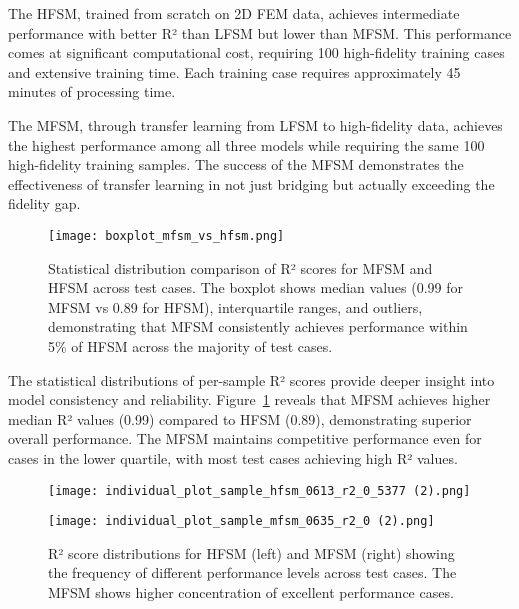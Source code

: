 \documentclass[12pt,a4paper]{report}
\begin{document}
The HFSM, trained from scratch on 2D FEM data, achieves intermediate performance with better R² than LFSM but lower than MFSM. This performance comes at significant computational cost, requiring 100 high-fidelity training cases and extensive training time. Each training case requires approximately 45 minutes of processing time.

The MFSM, through transfer learning from LFSM to high-fidelity data, achieves the highest performance among all three models while requiring the same 100 high-fidelity training samples. The success of the MFSM demonstrates the effectiveness of transfer learning in not just bridging but actually exceeding the fidelity gap.

\begin{figure}[htbp]
\centering
\texttt{[image: boxplot\_mfsm\_vs\_hfsm.png]}
\caption{Statistical distribution comparison of R² scores for MFSM and HFSM across test cases. The boxplot shows median values (0.99 for MFSM vs 0.89 for HFSM), interquartile ranges, and outliers, demonstrating that MFSM consistently achieves performance within 5\% of HFSM across the majority of test cases.}
\label{fig:boxplot_comparison}
\end{figure}

The statistical distributions of per-sample R² scores provide deeper insight into model consistency and reliability. Figure~\ref{fig:boxplot_comparison} reveals that MFSM achieves higher median R² values (0.99) compared to HFSM (0.89), demonstrating superior overall performance. The MFSM maintains competitive performance even for cases in the lower quartile, with most test cases achieving high R² values.

\begin{figure}[htbp]
\centering
\begin{minipage}{0.49\textwidth}
\centering
\texttt{[image: individual\_plot\_sample\_hfsm\_0613\_r2\_0\_5377 (2).png]}
\end{minipage}
\hfill
\begin{minipage}{0.49\textwidth}
\centering
\texttt{[image: individual\_plot\_sample\_mfsm\_0635\_r2\_0 (2).png]}
\end{minipage}
\caption{R² score distributions for HFSM (left) and MFSM (right) showing the frequency of different performance levels across test cases. The MFSM shows higher concentration of excellent performance cases.}
\label{fig:r2_histograms}
\end{figure}
\end{document}
